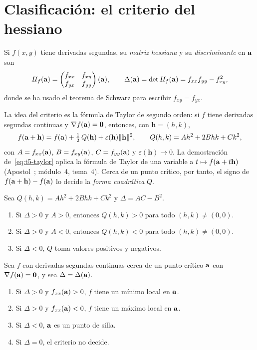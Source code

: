 \section{Clasificación: el criterio del hessiano}

\begin{definicion}\label{def:hessiana}
Si $f(x,y)$ tiene derivadas segundas, su \emph{matriz hessiana} y su \emph{discriminante} en $\mathbf{a}$ son
\[
H_f(\mathbf{a})=\begin{pmatrix}f_{xx}&f_{xy}\\f_{yx}&f_{yy}\end{pmatrix}(\mathbf{a}),\qquad
\Delta(\mathbf{a})=\det H_f(\mathbf{a})=f_{xx}f_{yy}-f_{xy}^2 ,
\]
donde se ha usado el teorema de Schwarz para escribir $f_{xy}=f_{yx}$.
\end{definicion}

La idea del criterio es la fórmula de Taylor de segundo orden: si $f$ tiene derivadas segundas continuas y $\nabla f(\mathbf{a})=\mathbf{0}$, entonces, con $\mathbf h=(h,k)$,
\begin{equation}\label{eq:t5-taylor}
f(\mathbf{a}+\mathbf h)=f(\mathbf{a})+\tfrac12\,Q(\mathbf h)+\varepsilon(\mathbf h)\lVert\mathbf h\rVert^2,\qquad Q(h,k)=Ah^2+2Bhk+Ck^2,
\end{equation}
con $A=f_{xx}(\mathbf{a})$, $B=f_{xy}(\mathbf{a})$, $C=f_{yy}(\mathbf{a})$ y $\varepsilon(\mathbf h)\to0$. La demostración de~\eqref{eq:t5-taylor} aplica la fórmula de Taylor de una variable a $t\mapsto f(\mathbf{a}+t\mathbf h)$ (Apostol~\cite[§9.9--9.12]{apostol2}; módulo~4, tema~4). Cerca de un punto crítico, por tanto, el signo de $f(\mathbf{a}+\mathbf h)-f(\mathbf{a})$ lo decide la \emph{forma cuadrática} $Q$.

\begin{lema}\label{lem:forma}
Sea $Q(h,k)=Ah^2+2Bhk+Ck^2$ y $\Delta=AC-B^2$.
\begin{enumerate}
  \item Si $\Delta>0$ y $A>0$, entonces $Q(h,k)>0$ para todo $(h,k)\neq(0,0)$.
  \item Si $\Delta>0$ y $A<0$, entonces $Q(h,k)<0$ para todo $(h,k)\neq(0,0)$.
  \item Si $\Delta<0$, $Q$ toma valores positivos y negativos.
\end{enumerate}
\end{lema}

\begin{teorema}\label{teo:hessiano}
Sea $f$ con derivadas segundas continuas cerca de un punto crítico $\mathbf{a}$ con $\nabla f(\mathbf{a})=\mathbf{0}$, y sea $\Delta=\Delta(\mathbf{a})$.
\begin{enumerate}
  \item Si $\Delta>0$ y $f_{xx}(\mathbf{a})>0$, $f$ tiene un mínimo local en $\mathbf{a}$.
  \item Si $\Delta>0$ y $f_{xx}(\mathbf{a})<0$, $f$ tiene un máximo local en $\mathbf{a}$.
  \item Si $\Delta<0$, $\mathbf{a}$ es un punto de silla.
  \item Si $\Delta=0$, el criterio no decide.
\end{enumerate}
\end{teorema}

